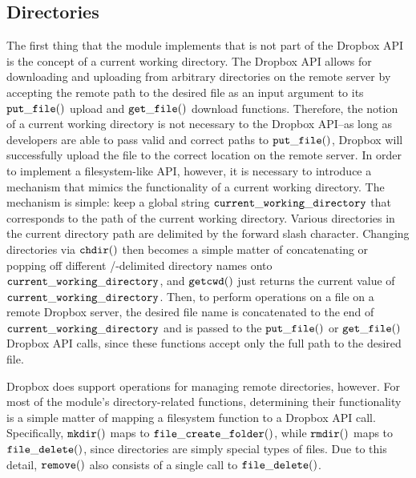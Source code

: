 \documentclass[pageno]{jpaper}
\newcommand{\cwd}{\tt{current\_working\_directory}}
\begin{document}
\subsection{Directories}
The first thing that the module implements that is not part of the Dropbox API is the concept of a current working directory. The Dropbox API allows for downloading and uploading from arbitrary directories on the remote server by accepting the remote path to the desired file as an input argument to its $\tt{put\_file()}$ upload and $\tt{get\_file()}$ download functions. Therefore, the notion of a current working directory is not necessary to the Dropbox API--as long as developers are able to pass valid and correct paths to $\tt{put\_file()}$, Dropbox will successfully upload the file to the correct location on the remote server. In order to implement a filesystem-like API, however, it is necessary to introduce a mechanism that mimics the functionality of a current working directory. The mechanism is simple: keep a global string $\tt{current\_working\_directory}$ that corresponds to the path of the current working directory. Various directories in the current directory path are delimited by the forward slash character. Changing directories via $\tt{chdir()}$ then becomes a simple matter of concatenating or popping off different /-delimited directory names onto $\cwd$, and $\tt{getcwd()}$ just returns the current value of $\cwd$. Then, to perform operations on a file on a remote Dropbox server, the desired file name is concatenated to the end of $\cwd$ and is passed to the $\tt{put\_file()}$ or $\tt{get\_file()}$ Dropbox API calls, since these functions accept only the full path to the desired file.

Dropbox does support operations for managing remote directories, however. For most of the module's directory-related functions, determining their functionality is a simple matter of mapping a filesystem function to a Dropbox API call. Specifically, $\tt{mkdir()}$ maps to $\tt{file\_create\_folder()}$, while $\tt{rmdir()}$ maps to $\tt{file\_delete()}$, since directories are simply special types of files. Due to this detail, $\tt{remove()}$ also consists of a single call to $\tt{file\_delete()}$.
\end{document}
